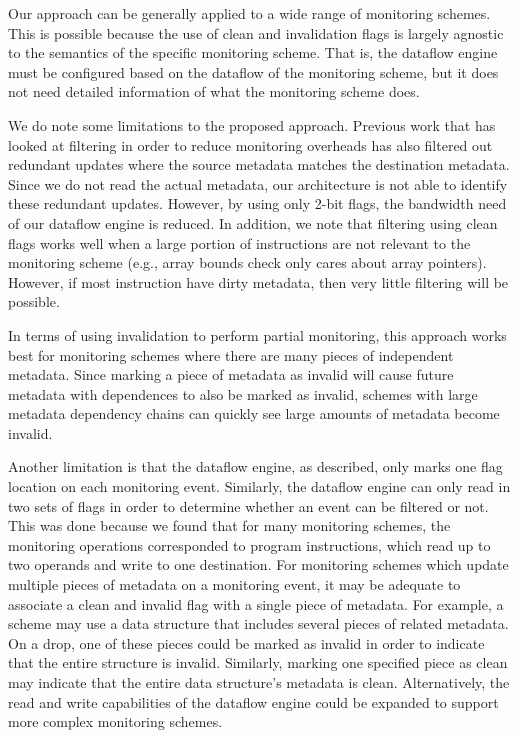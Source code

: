 Our approach can be generally applied to a wide range of monitoring schemes. This
is possible because the use of clean and invalidation flags is largely agnostic
to the semantics of the specific monitoring scheme. That is, the dataflow
engine must be configured based on the dataflow of the monitoring scheme, but
it does not need detailed information of what the monitoring scheme does. 

We do note some limitations to the proposed approach. Previous work
\cite{fade-hpca14} that has looked at filtering in order to reduce monitoring
overheads has also filtered out redundant updates where the source metadata
matches the destination metadata. Since we do not read the actual metadata, our
architecture is not able to identify these redundant updates. However, by using
only 2-bit flags, the bandwidth need of our dataflow engine is reduced.  
In addition, we note that filtering using clean flags works well when a large
portion of instructions are not relevant to the monitoring scheme (e.g., array
bounds check only cares about array pointers). However, if most instruction
have dirty metadata, then very little filtering will be possible. 

In terms of using invalidation to perform partial monitoring, this 
approach works best for monitoring schemes where there are many pieces of
independent metadata. Since marking a piece of metadata as invalid will cause
future metadata with dependences to also be marked as invalid, schemes with
large metadata dependency chains can quickly see large amounts of metadata
become invalid. 

Another limitation is that the dataflow engine, as described, only marks one
flag location on each monitoring event. Similarly, the dataflow engine can only
read in two sets of flags in order to determine whether an event can be
filtered or not. This was done because we found that for many monitoring
schemes, the monitoring operations corresponded to program instructions, which
read up to two operands and write to one destination.  For monitoring schemes
which update multiple pieces of metadata on a monitoring event, it may be
adequate to associate a clean and invalid flag with a single piece of metadata.  For
example, a scheme may use a data structure that includes several pieces of
related metadata. On a drop, one of these pieces could be marked as invalid in
order to indicate that the entire structure is invalid.  Similarly, marking one
specified piece as clean may indicate that the entire data structure's metadata
is clean.  Alternatively, the read and write capabilities of the dataflow
engine could be expanded to support more complex monitoring schemes.
